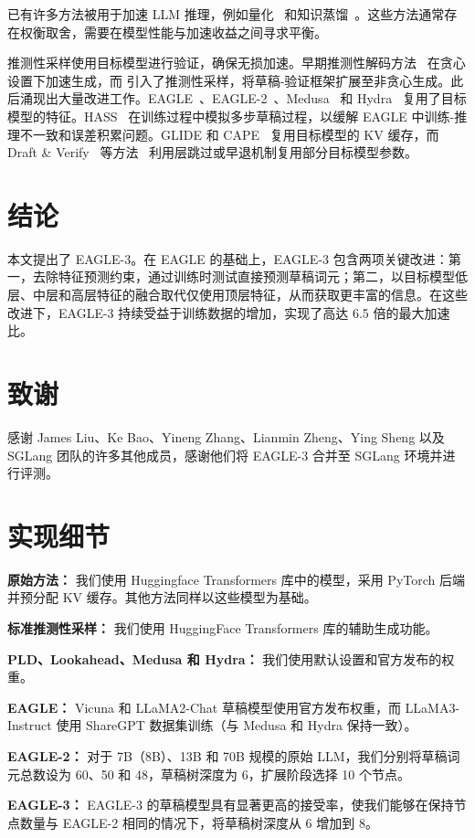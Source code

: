 \documentclass[11pt]{article}
\begin{document}
已有许多方法被用于加速 LLM 推理，例如量化~\cite{hubara2018quantized,shen2020q,kim2021bert,zadeh2020gobo,zafrir2019q8bert} 和知识蒸馏~\cite{hinton2015distilling}。这些方法通常存在权衡取舍，需要在模型性能与加速收益之间寻求平衡。

推测性采样使用目标模型进行验证，确保无损加速。早期推测性解码方法~\cite{stern2018blockwise, sun2021instantaneous} 在贪心设置下加速生成，而 \citet{leviathan2023fast, chen2023accelerating} 引入了推测性采样，将草稿-验证框架扩展至非贪心生成。此后涌现出大量改进工作。EAGLE~\cite{li2024eagle}、EAGLE-2~\cite{li2024eagle2}、Medusa~\cite{cai2024medusa} 和 Hydra~\cite{ankner2024hydra} 复用了目标模型的特征。HASS~\cite{zhang2024learning} 在训练过程中模拟多步草稿过程，以缓解 EAGLE 中训练-推理不一致和误差积累问题。GLIDE 和 CAPE~\cite{du2024glide} 复用目标模型的 KV 缓存，而 Draft \& Verify~\cite{zhang2023draft} 等方法~\cite{hooper2023speed,yang2023predictive,monea2023pass,li2024nearest,yi2024generation,liu2024kangaroo,sun2024triforce,elhoushi2024layer,svirschevski2024specexec} 利用层跳过或早退机制复用部分目标模型参数。

\section{结论}

本文提出了 EAGLE-3。在 EAGLE 的基础上，EAGLE-3 包含两项关键改进：第一，去除特征预测约束，通过训练时测试直接预测草稿词元；第二，以目标模型低层、中层和高层特征的融合取代仅使用顶层特征，从而获取更丰富的信息。在这些改进下，EAGLE-3 持续受益于训练数据的增加，实现了高达 6.5 倍的最大加速比。

\section*{致谢}

感谢 James Liu、Ke Bao、Yineng Zhang、Lianmin Zheng、Ying Sheng 以及 SGLang 团队的许多其他成员，感谢他们将 EAGLE-3 合并至 SGLang 环境并进行评测。



\newpage
\clearpage
\appendix

\section{实现细节}
\label{sec:id}

\textbf{原始方法：} 我们使用 Huggingface Transformers 库中的模型，采用 PyTorch 后端并预分配 KV 缓存。其他方法同样以这些模型为基础。

\textbf{标准推测性采样：} 我们使用 HuggingFace Transformers 库的辅助生成功能。

\textbf{PLD、Lookahead、Medusa 和 Hydra：} 我们使用默认设置和官方发布的权重。

\textbf{EAGLE：} Vicuna 和 LLaMA2-Chat 草稿模型使用官方发布权重，而 LLaMA3-Instruct 使用 ShareGPT 数据集训练（与 Medusa 和 Hydra 保持一致）。

\textbf{EAGLE-2：} 对于 7B（8B）、13B 和 70B 规模的原始 LLM，我们分别将草稿词元总数设为 60、50 和 48，草稿树深度为 6，扩展阶段选择 10 个节点。

\textbf{EAGLE-3：} EAGLE-3 的草稿模型具有显著更高的接受率，使我们能够在保持节点数量与 EAGLE-2 相同的情况下，将草稿树深度从 6 增加到 8。
\end{document}
